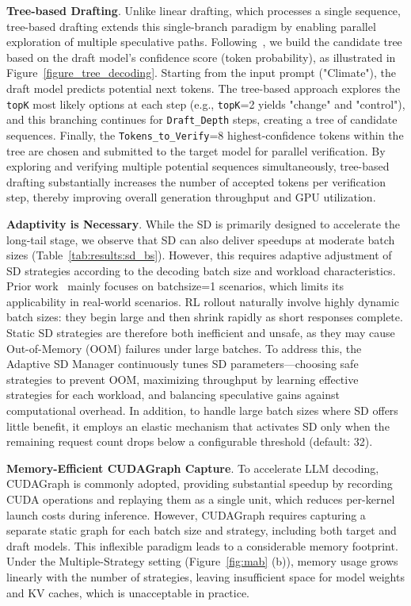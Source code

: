 \documentclass[sigplan,screen]{acmart}
\begin{document}
\noindent\textbf{Tree-based Drafting}.
Unlike linear drafting, which processes a single sequence, tree-based drafting extends this single-branch paradigm by enabling parallel exploration of multiple speculative paths. 
Following~\cite{SpecInfer, Eagle2}, we build the candidate tree based on the draft model's confidence score (token probability), as illustrated in Figure~\ref{figure_tree_decoding}.
Starting from the input prompt ("Climate"), the draft model predicts potential next tokens. The tree-based approach explores the \texttt{topK} most likely options at each step (e.g., \texttt{topK}=2 yields "change" and "control"), and this branching continues for \texttt{Draft\_Depth} steps, creating a tree of candidate sequences. Finally, the \texttt{Tokens\_to\_Verify}=8 highest-confidence tokens within the tree are chosen and submitted to the target model for parallel verification. By exploring and verifying multiple potential sequences simultaneously, tree-based drafting substantially increases the number of accepted tokens per verification step, thereby improving overall generation throughput and GPU utilization. %


\noindent\textbf{Adaptivity is Necessary}.
While the SD is primarily designed to accelerate the long-tail stage, we observe that SD can also deliver speedups at moderate batch sizes (Table~\ref{tab:results:sd_bs}). However, this requires adaptive adjustment of SD strategies according to the decoding batch size and workload characteristics. Prior work~\cite{Eagle1,Eagle2,HASS} mainly focuses on batchsize=1 scenarios, which limits its applicability in real-world scenarios.
RL rollout naturally involve highly dynamic batch sizes: they begin large and then shrink rapidly as short responses complete. Static SD strategies are therefore both inefficient and unsafe, as they may cause Out-of-Memory (OOM) failures under large batches. To address this, the Adaptive SD Manager continuously tunes SD parameters—choosing safe strategies to prevent OOM, maximizing throughput by learning effective strategies for each workload, and balancing speculative gains against computational overhead. In addition, to handle large batch sizes where SD offers little benefit, it employs an elastic mechanism that activates SD only when the remaining request count drops below a configurable threshold (default: 32).

\noindent\textbf{Memory-Efficient CUDAGraph Capture}.
To accelerate LLM decoding, CUDAGraph is commonly adopted, providing substantial speedup by recording CUDA operations and replaying them as a single unit, which reduces per-kernel launch costs during inference. However, CUDAGraph requires capturing a separate static graph for each batch size and strategy, including both target and draft models. This inflexible paradigm leads to a considerable memory footprint. Under the Multiple-Strategy setting (Figure~\ref{fig:mab} (b)), memory usage grows linearly with the number of strategies, leaving insufficient space for model weights and KV caches, which is unacceptable in practice.
\end{document}
